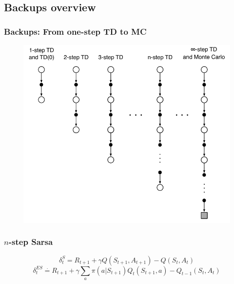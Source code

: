\documentclass{beamer}
\begin{document}
\subsection{Backups overview}

\begin{frame}
  \frametitle{Backups: From one-step TD to MC}
  \begin{figure}
    \centering
    \includegraphics[height=0.7 \textheight]{one-step-to-multi-step}
  \end{figure}
\end{frame}

\begin{frame}
  \frametitle{$n$-step Sarsa}
  $$\delta^{S}_t = R_{t + 1} + \gamma Q(S_{t + 1}, A_{t + 1}) - Q(S_t, A_t)$$
  $$\delta^{ES}_t \overset{\cdot}{=} R_{t + 1} +
    \gamma \sum_{a} \pi(a | S_{t + 1}) Q_t(S_{t + 1}, a) - Q_{t - 1}(S_t, A_t)$$
\end{frame}
\end{document}
